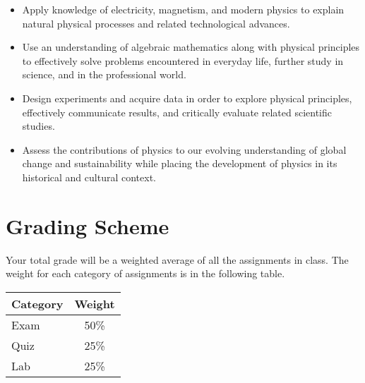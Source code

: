 \documentclass{article}
\begin{document}
%
\begin{itemize}

\item Apply knowledge of electricity, magnetism, and modern physics to explain natural physical processes and related technological advances.

\item Use an understanding of algebraic mathematics along with physical principles to effectively solve problems encountered in everyday life, further study in science, and in the professional world.

\item Design experiments and acquire data in order to explore physical principles, effectively communicate results, and critically evaluate related scientific studies.

\item Assess the contributions of physics to our evolving understanding of global change and sustainability while placing the development of physics in its historical and cultural context.

\end{itemize}





\section{Grading Scheme}

Your total grade will be a weighted average of all the assignments in class. The weight for each category of assignments is in the following table.

\begin{center}

\renewcommand{\arraystretch}{1.5}
\renewcommand{\tabcolsep}{0.2cm}

\begin{tabular}{lc}
\hline
\textbf{Category} & \textbf{Weight} \\
\hline

Exam & 50\% \\

Quiz & 25\% \\

Lab & 25\% \\

\hline
\end{tabular}

\end{center}
\end{document}
